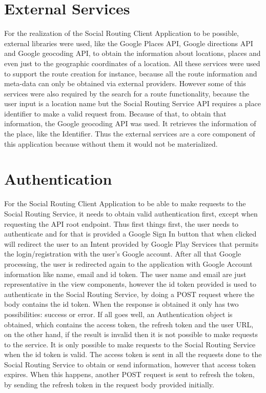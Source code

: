 \newpage

\section{External Services}
For the realization of the Social Routing Client Application to be possible, external libraries were used, like the Google Places API, Google directions API and
Google geocoding API, to obtain the information about locations, places and even just to the geographic coordinates of a location. All these services were used to support
the route creation for instance, because all the route information and meta-data can only be obtained via external providers. However some of this services were
also required by the search for a route functionality, because the user input is a location name but the Social Routing Service API requires a place identifier to make a valid request from.
Because of that, to obtain that information, the Google geocoding API was used. It retrieves the information of the place, like the Identifier. Thus the external services are
a core component of this application because without them it would not be materialized.

\section{Authentication} \label{authentication}
For the Social Routing Client Application to be able to make requests to the Social Routing Service, it needs to obtain valid authentication first, except when requesting the API root endpoint.
Thus first things first, the user needs to authenticate and for that is provided a Google Sign In button that when clicked will redirect the user to an Intent provided
by Google Play Services that permits the login/registration with the user's Google account. After all that Google processing, the user is redirected again to the application with
Google Account information like name, email and id token. The user name and email are just representative in the view components, however the id token provided is used
to authenticate in the Social Routing Service, by doing a POST request where the body contains the id token. When the response is obtained it only has two
possibilities: success or error. If all goes well,  an Authentication object is obtained, which contains the access token, the refresh token and the user URL,
on the other hand, if the result is invalid then it is not possible to make requests to the service. It is only possible to make requests to the Social Routing Service when the id token is valid. The access token is sent in all
the requests done to the Social Routing Service to obtain or send information, however that access token expires. When this happens, another POST request is sent
to refresh the token, by sending the refresh token in the request body provided initially.